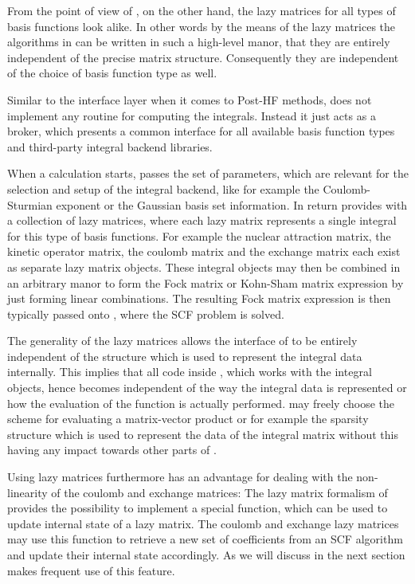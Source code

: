 From the point of view of \gscf,
on the other hand,
the lazy matrices for all types of basis functions look alike.
In other words by the means of the lazy matrices
the algorithms in \gscf
can be written in such a high-level manor,
that they are entirely independent of the precise matrix structure.
Consequently they are independent of the choice of basis function type as well.





Similar to the \molsturm interface layer when it comes to Post-HF methods,
\gint does not implement any routine for computing the integrals.
Instead it just acts as a broker,
which presents a common interface for all available basis function types
and third-party integral backend libraries.

When a calculation starts,
\molsturm passes \gint the set of parameters,
which are relevant for the selection and setup of the integral backend,
like for example the Coulomb-Sturmian exponent or the Gaussian basis set information.
In return \gint provides \molsturm with a collection of lazy matrices,
where each lazy matrix represents a single integral for this
type of basis functions.
For example the nuclear attraction matrix, the kinetic operator matrix,
the coulomb matrix and the exchange matrix each exist as separate
lazy matrix objects.
These integral objects may then be combined
in an arbitrary manor to form the Fock matrix or Kohn-Sham matrix
expression by just forming linear combinations.
The resulting Fock matrix expression is then typically passed onto \gscf,
where the SCF problem is solved.

The generality of the lazy matrices allows the interface of \gint
to be entirely independent of the structure
which is used to represent the integral data internally.
This implies that all code inside \molsturm,
which works with the integral objects,
hence becomes independent of the way the integral data is represented
or how the evaluation of the \contraction function is actually performed.
\gint may freely choose the scheme for evaluating a matrix-vector
product or for example the sparsity structure which is used to
represent the data of the integral matrix
without this having any impact towards other parts of \molsturm.

Using lazy matrices furthermore has an advantage for
dealing with the non-linearity of the coulomb and exchange matrices:
The lazy matrix formalism of \lazyten provides the possibility
to implement a special \update function,
which can be used to update internal state of a lazy matrix.
The coulomb and exchange lazy matrices
may use this function to retrieve a new set of coefficients from an
SCF algorithm and update
their internal state accordingly.
As we will discuss in the next section \gscf makes frequent use of this feature.

